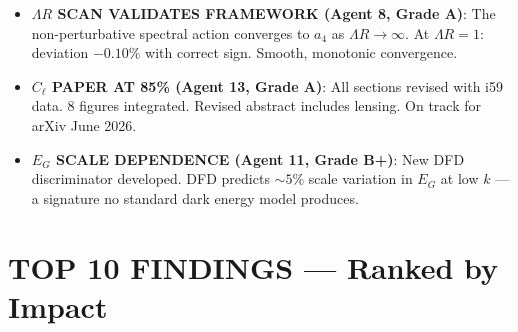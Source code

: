 \documentclass[11pt,a4paper]{article}
\begin{document}
\begin{itemize}
\item \textbf{$\Lambda R$ SCAN VALIDATES FRAMEWORK (Agent 8, Grade A)}: The non-perturbative spectral action converges to $a_4$ as $\Lambda R \to \infty$. At $\Lambda R = 1$: deviation $-0.10\%$ with correct sign. Smooth, monotonic convergence.

\item \textbf{$C_\ell$ PAPER AT 85\% (Agent 13, Grade A)}: All sections revised with i59 data. 8 figures integrated. Revised abstract includes lensing. On track for arXiv June 2026.

\item \textbf{$E_G$ SCALE DEPENDENCE (Agent 11, Grade B+)}: New DFD discriminator developed. DFD predicts $\sim 5\%$ scale variation in $E_G$ at low $k$ --- a signature no standard dark energy model produces.
\end{itemize}


\section{TOP 10 FINDINGS --- Ranked by Impact}
\label{sec:top10}
\end{document}
